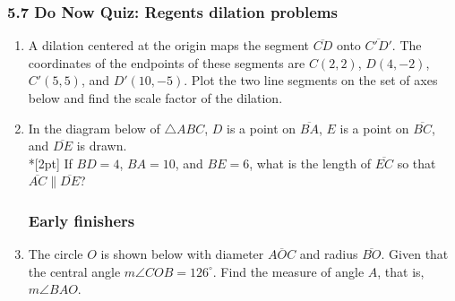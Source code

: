 \documentclass[12pt, twoside]{article}
\begin{document}
\subsubsection*{5.7 Do Now Quiz: Regents dilation problems}
 \begin{enumerate}


\item A dilation centered at the origin maps the segment $\overline{CD}$ onto $\overline{C'D'}$. The coordinates of the endpoints of these segments are $C(2,2)$, $D(4,-2)$, $C'(5,5)$, and $D'(10,-5)$. Plot the two line segments on the set of axes below and find the scale factor of the dilation.
  \begin{flushright}
  \end{flushright}


 \item In the diagram below of $\triangle ABC$, $D$ is a point on $\overline{BA}$, $E$ is a point on $\overline{BC}$, and $\overline{DE}$ is drawn. \\*[2pt] 
 If $BD=4$, $BA=10$, and $BE=6$, what is the length of $\overline{EC}$ so that $\overline{AC} \parallel \overline{DE}$?
 
 \begin{flushright}
   \end{flushright}

\newpage
\subsubsection*{Early finishers}

\item The circle $O$ is shown below with diameter $\overline{AOC}$ and radius $\overline{BO}$. Given that the central angle $m\angle COB=126^\circ$. Find the measure of angle $A$, that is, $m\angle BAO$.
\begin{flushright}
\end{flushright} %


\end{enumerate}
\end{document}
